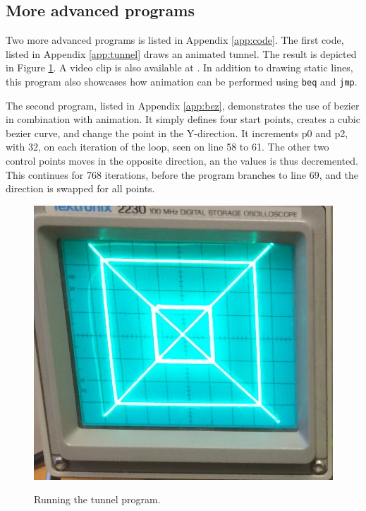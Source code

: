 \subsection{More advanced programs}
Two more advanced programs is listed in Appendix \ref{app:code}.
The first code, listed in Appendix \ref{app:tunnel} draws an animated tunnel.
The result is depicted in Figure \ref{fig:tunnel}.
A video clip is also available at \cite{tunnel-demo}.
In addition to drawing static lines, this program also showcases how animation can be performed using \texttt{beq} and \texttt{jmp}.

The second program, listed in Appendix \ref{app:bez}, demonstrates the use of bezier in combination with animation.
It simply defines four start points, creates a cubic bezier curve, and change the point in the Y-direction. It increments p0 and p2, with 32, on each iteration of the loop, seen on line 58 to 61.
The other two control points moves in the opposite direction, an the values is thus decremented. This continues for 768 iterations, before the program branches to line 69, and the direction is swapped for all points.

\begin{figure}[h]
	\centering
	\includegraphics[]{images/tunnel.jpg}
	\label{fig:tunnel}
	\caption{Running the tunnel program.}
\end{figure}
